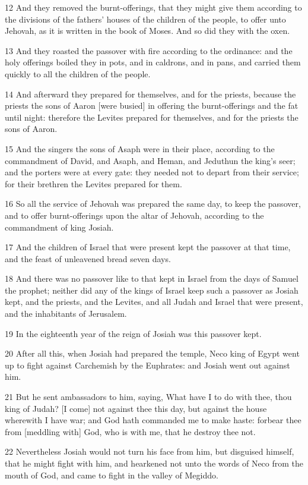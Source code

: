 \par 12 And they removed the burnt-offerings, that they might give them according to the divisions of the fathers' houses of the children of the people, to offer unto Jehovah, as it is written in the book of Moses. And so did they with the oxen.
\par 13 And they roasted the passover with fire according to the ordinance: and the holy offerings boiled they in pots, and in caldrons, and in pans, and carried them quickly to all the children of the people.
\par 14 And afterward they prepared for themselves, and for the priests, because the priests the sons of Aaron [were busied] in offering the burnt-offerings and the fat until night: therefore the Levites prepared for themselves, and for the priests the sons of Aaron.
\par 15 And the singers the sons of Asaph were in their place, according to the commandment of David, and Asaph, and Heman, and Jeduthun the king's seer; and the porters were at every gate: they needed not to depart from their service; for their brethren the Levites prepared for them.
\par 16 So all the service of Jehovah was prepared the same day, to keep the passover, and to offer burnt-offerings upon the altar of Jehovah, according to the commandment of king Josiah.
\par 17 And the children of Israel that were present kept the passover at that time, and the feast of unleavened bread seven days.
\par 18 And there was no passover like to that kept in Israel from the days of Samuel the prophet; neither did any of the kings of Israel keep such a passover as Josiah kept, and the priests, and the Levites, and all Judah and Israel that were present, and the inhabitants of Jerusalem.
\par 19 In the eighteenth year of the reign of Josiah was this passover kept.
\par 20 After all this, when Josiah had prepared the temple, Neco king of Egypt went up to fight against Carchemish by the Euphrates: and Josiah went out against him.
\par 21 But he sent ambassadors to him, saying, What have I to do with thee, thou king of Judah? [I come] not against thee this day, but against the house wherewith I have war; and God hath commanded me to make haste: forbear thee from [meddling with] God, who is with me, that he destroy thee not.
\par 22 Nevertheless Josiah would not turn his face from him, but disguised himself, that he might fight with him, and hearkened not unto the words of Neco from the mouth of God, and came to fight in the valley of Megiddo.
